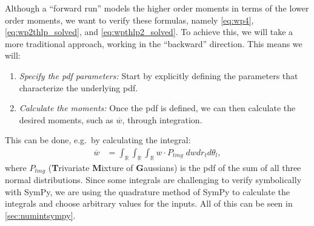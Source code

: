 Although a \enquote{forward run} models the higher order moments in terms of the lower order moments,
we want to verify these formulas,
namely \cref{eq:wp4}, \cref{eq:wp2thlp_solved}, and \cref{eq:wpthlp2_solved}.
To achieve this, we will take a more traditional approach, working in the \enquote{backward} direction.
This means we will:
\begin{enumerate}
    \item \emph{Specify the \gls{pdf} parameters:}
    Start by explicitly defining the parameters that characterize the underlying \gls{pdf}.
    \item \emph{Calculate the moments:}
    Once the \gls{pdf} is defined, we can then calculate the desired moments,
    such as $\overline{w}$, through integration.
\end{enumerate}
This can be done, e.g.\ by calculating the integral:
\begin{align}
    \overline{w}
    &= \int_{\mathbb{R}} \int_{\mathbb{R}} \int_{\mathbb{R}} w \cdot P_{tmg} \; dw dr_t d\theta_l,
\end{align}
where $P_{tmg}$ (\textbf{T}rivariate \textbf{M}ixture of \textbf{G}aussians)
is the \gls{pdf} of the sum of all three normal distributions.
Since some integrals are challenging to verify symbolically with SymPy,
we are using the quadrature method of SymPy to calculate the integrals
and choose arbitrary values for the inputs.
All of this can be seen in \cref{sec:numintsympy}.
